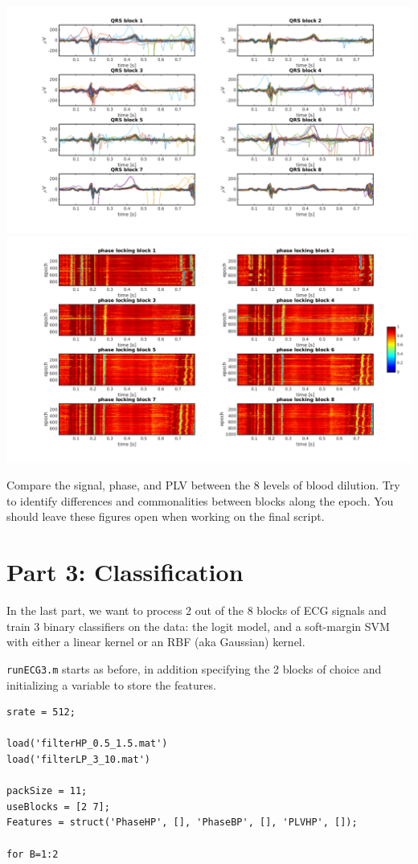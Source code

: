 \documentclass[10pt,a4paper,notitlepage]{report}
\begin{document}
\hspace{-1cm} \includegraphics[scale=0.25]{p2fig9.png}
\includegraphics[scale=0.25]{p2fig10.png}
\vspace{5mm}

Compare the signal, phase, and PLV between the 8 levels of blood dilution. Try to identify differences and commonalities between blocks along the epoch. You should leave these figures open when working on the final script.


\section*{Part 3: Classification}
In the last part, we want to process 2 out of the 8 blocks of ECG signals and train 3 binary classifiers on the data: the logit model, and a soft-margin SVM with either a linear kernel or an RBF (aka Gaussian) kernel.

\texttt{runECG3.m} starts as before, in addition specifying the 2 blocks of choice and initializing a variable to store the features.

\begin{verbatim}
srate = 512;

load('filterHP_0.5_1.5.mat')
load('filterLP_3_10.mat')

packSize = 11;
useBlocks = [2 7];
Features = struct('PhaseHP', [], 'PhaseBP', [], 'PLVHP', []);

for B=1:2
\end{verbatim}
\end{document}
